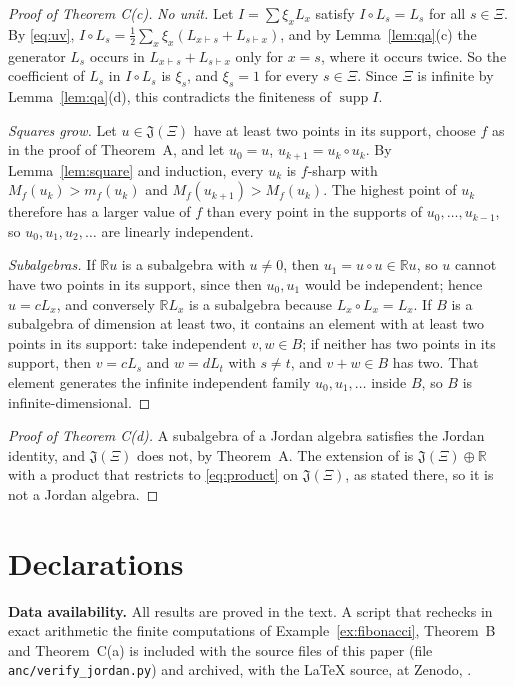 \documentclass[11pt]{amsart}
\theoremstyle{definition}
\theoremstyle{remark}
\newcommand{\R}{\mathbb{R}}
\newcommand{\J}{\mathfrak{J}}
\newcommand{\qa}{\vdash}
\newcommand{\supp}{\operatorname{supp}}
\begin{document}
\begin{proof}[Proof of Theorem C(c)]
\emph{No unit.} Let $I=\sum\xi_xL_x$ satisfy $I\circ L_s=L_s$ for all $s\in\Xi$. By \eqref{eq:uv}, $I\circ L_s=\frac12\sum_x\xi_x(L_{x\qa s}+L_{s\qa x})$, and by Lemma~\ref{lem:qa}(c) the generator $L_s$ occurs in $L_{x\qa s}+L_{s\qa x}$ only for $x=s$, where it occurs twice. So the coefficient of $L_s$ in $I\circ L_s$ is $\xi_s$, and $\xi_s=1$ for every $s\in\Xi$. Since $\Xi$ is infinite by Lemma~\ref{lem:qa}(d), this contradicts the finiteness of $\supp I$.

\emph{Squares grow.} Let $u\in\J(\Xi)$ have at least two points in its support, choose $f$ as in the proof of Theorem~A, and let $u_0=u$, $u_{k+1}=u_k\circ u_k$. By Lemma~\ref{lem:square} and induction, every $u_k$ is $f$-sharp with $M_f(u_k)>m_f(u_k)$ and $M_f(u_{k+1})>M_f(u_k)$. The highest point of $u_k$ therefore has a larger value of $f$ than every point in the supports of $u_0,\dots,u_{k-1}$, so $u_0,u_1,u_2,\dots$ are linearly independent.

\emph{Subalgebras.} If $\R u$ is a subalgebra with $u\ne0$, then $u_1=u\circ u\in\R u$, so $u$ cannot have two points in its support, since then $u_0,u_1$ would be independent; hence $u=cL_x$, and conversely $\R L_x$ is a subalgebra because $L_x\circ L_x=L_x$. If $B$ is a subalgebra of dimension at least two, it contains an element with at least two points in its support: take independent $v,w\in B$; if neither has two points in its support, then $v=cL_s$ and $w=dL_t$ with $s\neq t$, and $v+w\in B$ has two. That element generates the infinite independent family $u_0,u_1,\dots$ inside $B$, so $B$ is infinite-dimensional.
\end{proof}

\begin{proof}[Proof of Theorem C(d)]
A subalgebra of a Jordan algebra satisfies the Jordan identity, and $\J(\Xi)$ does not, by Theorem~A. The extension of \cite[Section~5]{CCAI25} is $\J(\Xi)\oplus\R$ with a product that restricts to \eqref{eq:product} on $\J(\Xi)$, as stated there, so it is not a Jordan algebra.
\end{proof}

\section*{Declarations}

\noindent\textbf{Data availability.} All results are proved in the text. A script that rechecks in exact arithmetic the finite computations of Example~\ref{ex:fibonacci}, Theorem~B and Theorem~C(a) is included with the source files of this paper (file \texttt{anc/verify\_jordan.py}) and archived, with the \LaTeX{} source, at Zenodo, .
\end{document}
